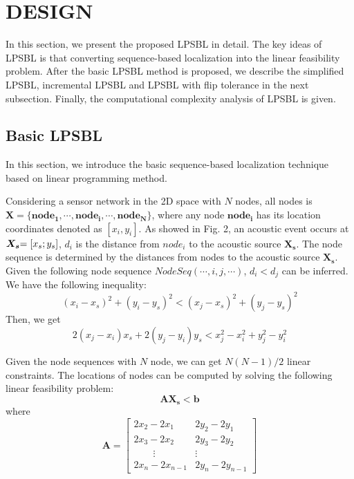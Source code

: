 
\section{DESIGN}

In this section, we present the proposed LPSBL in detail.
The key ideas of LPSBL is that converting sequence-based localization into the linear feasibility problem.
After the basic LPSBL method is proposed, we describe the simplified LPSBL, incremental LPSBL and LPSBL with flip tolerance in the next subsection.
Finally, the computational complexity analysis of LPSBL is given.

\subsection{Basic LPSBL}

In this section, we introduce the basic sequence-based localization technique based on linear programming method.

Considering a sensor network in the 2D space with $N$ nodes, all nodes is $\bm{X} = \{ \bm{nod{e_1}}, \cdots ,\bm{nod{e_i}}, \cdots ,\bm{nod{e_N}}\}$, 
where any node $\bm{nod{e_i}}$ has its location coordinates denoted as $[{x_i},{y_i}]$. 
As showed in Fig. 2, an acoustic event occurs at $\bm{X_s}{\rm{ = [}}{x_s};{y_s}]$, ${d_i}$ is the distance from $nod{e_i}$ to the acoustic source $\bm{X_s}$.
The node sequence is determined by the distances from nodes to the acoustic source $\bm{X_s}$.
Given the following node sequence $NodeSeq( \cdots ,i,j, \cdots )$, ${d_i}<{d_j}$ can be inferred. We have the following inequality:
 \begin{equation} \label{equation_1}
(x_i-x_s)^2+(y_i-y_s)^2 < (x_j-x_s)^2+(y_j-y_s)^2
 \end{equation}
Then, we get
\begin{equation} \label{equation_2}
2(x_j-x_i)x_s+2(y_j-y_i)y_s<x_j^2-x_i^2+y_j^2-y_i^2
\end{equation}

Given the node sequences with $N$ node, we can get $N(N - 1)/2$ linear constraints. The
locations of nodes can be computed by solving the following linear feasibility problem:
\begin{equation}
\bm {{A}{X_s}}< \bm{{b}}
\end{equation}
where
\[\bm{A} = 
\left[
\begin{array}{lcr}
2x_2-2x_1 & 2y_2-2y_1 \\
2x_3-2x_2 & 2y_3-2y_2 \\
\quad  \quad      \vdots  &   \vdots  \\
2x_n-2x_{n-1} & 2y_n-2y_{n-1}
\end{array}
\right]
\]

